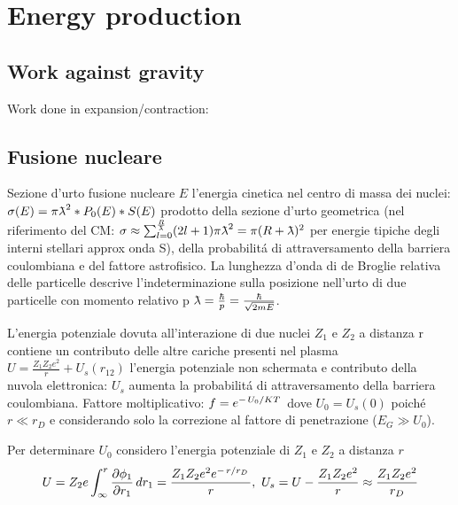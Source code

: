\section{Energy production}

\subsection{Work against gravity}

\begin{frame}{Work done in expansion/contraction: }

\end{frame}

\subsection{Fusione nucleare}

\begin{frame}{Sezione d'urto fusione nucleare}
$E$ l'energia cinetica nel centro di massa dei nuclei: $\sigma(E)=\pi\lambdabar^2*P_0(E)*S(E)$
prodotto della sezione d'urto geometrica (nel riferimento del CM: $\sigma\approx\sum_{l=0}^{\frac{R}{\lambdabar}}(2l+1)\pi\lambdabar^2=\pi(R+\lambdabar)^2$
per energie tipiche degli interni stellari approx onda S), della probabilit\'a di attraversamento della barriera coulombiana e del fattore astrofisico. La lunghezza d'onda di de Broglie relativa delle particelle descrive l'indeterminazione sulla posizione nell'urto di due particelle con momento relativo p $\lambdabar=\frac{\hbar}{p}=\frac{\hbar}{\sqrt{2mE}}$.

L'energia potenziale dovuta all'interazione di due nuclei $Z_1$ e $Z_2$ a distanza r contiene un contributo delle altre cariche presenti nel plasma $U=\frac{Z_1Z_2e^2}{r}+U_s(r_{12})$
l'energia potenziale non schermata e contributo della nuvola elettronica: $U_s$ aumenta la probabilit\'a di attraversamento della barriera coulombiana. Fattore moltiplicativo: $f=e^{-\left.{U_0}\middle/{KT}\right.}$ dove $U_0=U_s(0)$ poich\'e $r\ll r_D$ e considerando solo la correzione al fattore di penetrazione ($E_G\gg U_0$).

Per determinare $U_0$ considero l'energia potenziale di $Z_1$ e $Z_2$ a distanza $r$
\begin{equation*}
U=Z_2e\int_{\infty}^r\PDy{r_1}{\phi_1}\,dr_1=\frac{Z_1Z_2e^2\exp{-\midfrac{r}{r_D}}}{r},\ U_s=U-\frac{Z_1Z_2e^2}{r}\approx\frac{Z_1Z_2e^2}{r_D}
\end{equation*}
\end{frame}

